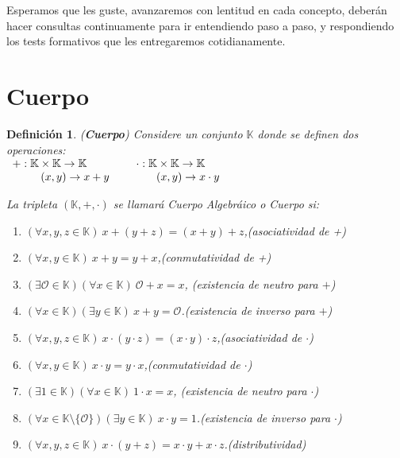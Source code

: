 \documentclass[12pt]{book}
\newtheorem{defi}{Definici\'on}
\def\K{\mathbb{K}}
\begin{document}
Esperamos que les guste, avanzaremos con lentitud en cada concepto, deberán hacer consultas continuamente para ir entendiendo paso a paso, y respondiendo los tests formativos que les entregaremos cotidianamente.

\section{Cuerpo}

\begin{defi}{\em (\textbf{Cuerpo})} Considere un conjunto $\K$ donde se definen dos operaciones:\\

\hspace{4 cm}$\begin{array}{l}
+:\K\times\K\rightarrow \K  \\
\hspace{0.9 cm}(x,y)\rightarrow x+y
\end{array}$\hspace{1 cm}$\begin{array}{ccc}
\cdot:\K\times\K\rightarrow \K\\
\hspace{1.1 cm}(x,y)\rightarrow x\cdot y
\end{array}$

La tripleta $(\K,+,\cdot)$ se llamar\'a Cuerpo Algebr\'aico o Cuerpo si:\\
\begin{enumerate}
\item $(\forall x,y,z\in \K)\ x+(y+z)=(x+y)+z$,\hfill (asociatividad de +)
\item $(\forall x,y\in \K)\ x+y=y+x$,\hfill(conmutatividad de +)
\item $(\exists \mathcal{O}\in \K)(\forall x\in \K)\ \mathcal{O}+x=x$, \hfill(existencia de neutro para $+$)
\item $(\forall x\in \K)(\exists y\in \K)\ x+y=\mathcal{O}$.\hfill(existencia de inverso para $+$)
\item $(\forall x,y,z\in \K)\ x\cdot(y\cdot z)=(x\cdot y)\cdot z$,\hfill (asociatividad de $\cdot$)
\item $(\forall x,y\in \K)\ x\cdot y=y\cdot x$,\hfill(conmutatividad de $\cdot$)
\item $(\exists 1\in \K)(\forall x\in \K)\ 1\cdot x=x$, \hfill(existencia de neutro para $\cdot$)
\item $(\forall x\in \K\setminus\{\mathcal{O}\})(\exists y\in \K)\ x\cdot y=1$.\hfill(existencia de inverso para $\cdot$)
\item $(\forall x,y,z\in\K)\ x\cdot(y+z)=x\cdot y+x\cdot z$.\hfill(distributividad)
\end{enumerate}
\end{defi}
\end{document}
